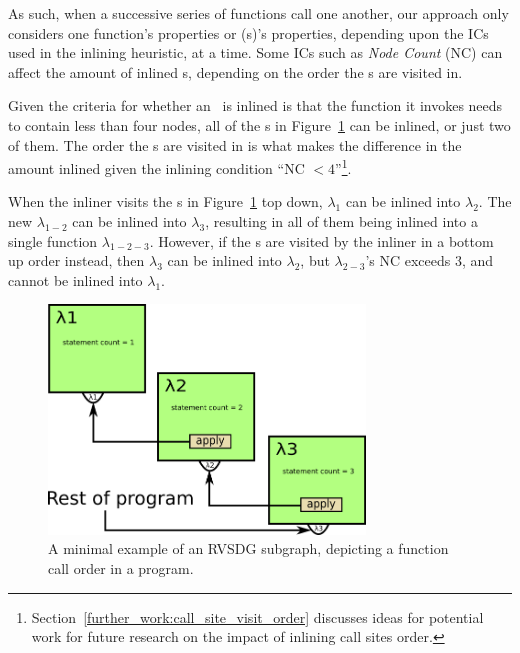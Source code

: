 
As such, when a successive series of functions call one another, our approach
only considers one function's properties or \applyNode (s)'s properties,
depending upon the ICs used in the inlining heuristic, at a time. Some ICs such
as \textit{Node Count} (NC) can affect the amount of inlined \applyNode s,
depending on the order the \applyNode s are visited in.

Given the criteria for whether an \applyNode~is inlined is that the function it
invokes needs to contain less than four nodes, all of the \applyNode s in
Figure~\ref{fig:inline_ordering_ex} can be inlined, or just two of them. The
order the \applyNode s are visited in is what makes the difference in the amount
inlined given the inlining condition ``NC $<
4$''\footnote{Section~\ref{further_work:call_site_visit_order} discusses ideas
for potential work for future research on the impact of inlining call sites
order.}.

When the inliner visits the \applyNode s in Figure~\ref{fig:inline_ordering_ex}
top down, $\lambda_1$ can be inlined into $\lambda_2$. The new $\lambda_{1-2}$
can be inlined into $\lambda_3$, resulting in all of them being inlined into a
single function $\lambda_{1-2-3}$. However, if the \applyNode s are visited by
the inliner in a bottom up order instead, then $\lambda_3$ can be inlined into
$\lambda_2$, but $\lambda_{2-3}$'s NC exceeds 3, and cannot be inlined into
$\lambda_1$.

\begin{figure}[H]
	\centering
	\includegraphics[width=0.75\textwidth]{figures/inline_ordering_ex}
	\caption{A minimal example of an RVSDG subgraph, depicting a function call
order in a program.}
	\label{fig:inline_ordering_ex}
\end{figure}

